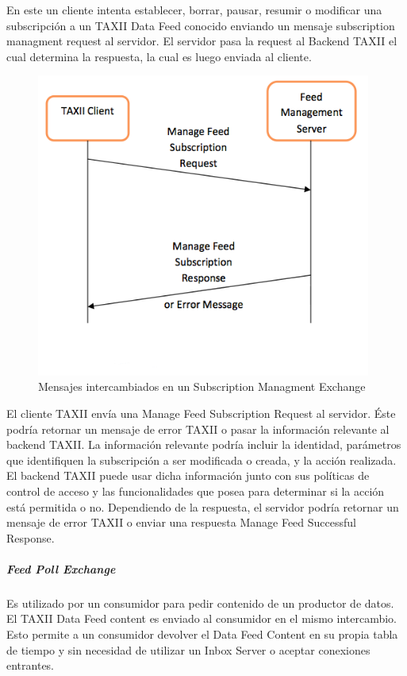 En este un cliente intenta establecer, borrar, pausar, resumir o modificar una 
subscripción a un TAXII Data Feed conocido enviando un mensaje subscription 
managment request al servidor. El servidor pasa la request al Backend TAXII el 
cual determina la respuesta, la cual es luego enviada al cliente.

\begin{figure}[H]
  \centering
    \includegraphics[width=110mm]{./images/SubscriptionManagmentExchange.png}
    \caption{Mensajes intercambiados en un Subscription Managment Exchange \protect\cite{b1}} 
\end{figure}

El cliente TAXII envía una Manage Feed Subscription Request al servidor. Éste 
podría retornar un mensaje de error TAXII o pasar la información relevante al 
backend TAXII. La información relevante podría incluir la identidad, parámetros 
que identifiquen la subscripción a ser modificada o creada, y la acción 
realizada. El backend TAXII puede usar dicha información junto con sus 
políticas de control de acceso y las funcionalidades que posea para determinar 
si la acción está permitida o no. Dependiendo de la respuesta, el servidor 
podría retornar un mensaje de error TAXII o enviar una respuesta Manage Feed 
Successful Response.

\subparagraph{Feed Poll Exchange}

Es utilizado por un consumidor para pedir contenido de un productor de datos. El TAXII Data Feed content es enviado al consumidor en el mismo intercambio. Esto permite a un consumidor devolver el Data Feed Content en su propia tabla de tiempo y sin necesidad de utilizar un Inbox Server o aceptar conexiones entrantes.\\

